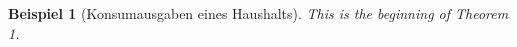 \documentclass{beamer}
\newtheorem{beisp}{Beispiel}
\begin{document}
\begin{frame}

\begin{beisp}[Konsumausgaben eines Haushalts]
    This is the beginning of Theorem 1.
\end{beisp} 

\end{frame} 
\end{document}
